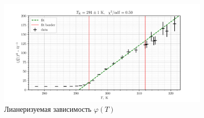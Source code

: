 \begin{figure}[h]
    \centering
    \includegraphics[width=0.9\textwidth]{plot.pdf}
    \caption{Лианеризуемая зависимость $\varphi(T)$}
    \label{fig:1}
\end{figure}
